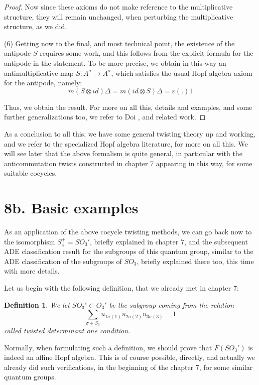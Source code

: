 \documentclass[12pt]{amsbook}
\newtheorem{definition}[theorem]{Definition}
\begin{document}
\begin{proof}
Now since these axioms do not make reference to the multiplicative structure, they will remain unchanged, when perturbing the multiplicative structure, as we did.

\medskip

(6) Getting now to the final, and most technical point, the existence of the antipode $S$ requires some work, and this follows from the explicit formula for the antipode in the statement. To be more precise, we obtain in this way an antimultiplicative map $S:A^\sigma\to A^\sigma$, which satisfies the usual Hopf algebra axiom for the antipode, namely:
$$m(S\otimes id)\Delta=m(id\otimes S)\Delta=\varepsilon(.)1$$

Thus, we obtain the result. For more on all this, details and examples, and some further generalizations too, we refer to Doi \cite{doi}, and related work.
\end{proof}

As a conclusion to all this, we have some general twisting theory up and working, and we refer to the specialized Hopf algebra literature, for more on all this. We will see later that the above formalism is quite general, in particular with the anticommutation twists constructed in chapter 7 appearing in this way, for some suitable cocycles.

\section*{8b. Basic examples}

As an application of the above cocycle twisting methods, we can go back now to the isomorphism $S_4^+=SO_3'$, briefly explained in chapter 7, and the subsequent ADE classification result for the subgroups of this quantum group, similar to the ADE classification of the subgroups of $SO_3$, briefly explained there too, this time with more details.

\bigskip

Let us begin with the following definition, that we already met in chapter 7:


\begin{definition}
We let $SO_3'\subset O_3'$ be the subgroup coming from the relation
$$\sum_{\sigma\in S_3}u_{1\sigma(1)}u_{2\sigma(2)}u_{3\sigma(3)}=1$$
called twisted determinant one condition.
\end{definition}

Normally, when formulating such a definition, we should prove that $F(SO_3')$ is indeed an affine Hopf algebra. This is of course possible, directly, and actually we already did such verifications, in the beginning of the chapter 7, for some similar quantum groups.
\end{document}

